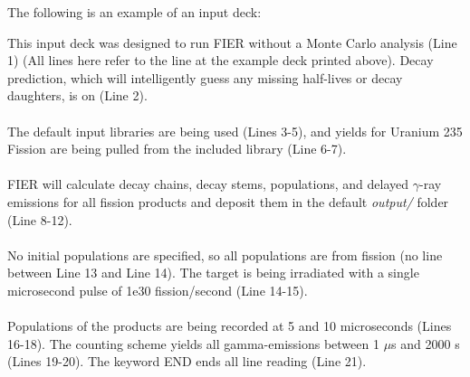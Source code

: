 \documentclass{article}
\begin{document}
\begin{appendices}
\newpage
\noindent The following is an example of an input deck: 

This input deck was designed to run FIER without a Monte Carlo analysis (Line 1) (All lines here refer to the line at the example deck printed above). Decay prediction, which will intelligently guess any missing half-lives or decay daughters, is on (Line 2).
\\\\
The default input libraries are being used (Lines 3-5), and yields for Uranium 235 Fission are being pulled from the included library (Line 6-7).
\\\\
FIER will calculate decay chains, decay stems, populations, and delayed $\gamma$-ray emissions for all fission products and deposit them in the default \textit{output/} folder (Line 8-12).
\\\\
No initial populations are specified, so all populations are from fission (no line between Line 13 and Line 14). The target is being irradiated with a single microsecond pulse of 1e30 fission/second (Line 14-15).
\\\\
Populations of the products are being recorded at 5 and 10 microseconds (Lines 16-18). The counting scheme yields all gamma-emissions between 1 $\mu$s and 2000 s (Lines 19-20). The keyword END ends all line reading (Line 21). 

\newpage


\end{appendices}
\end{document}

